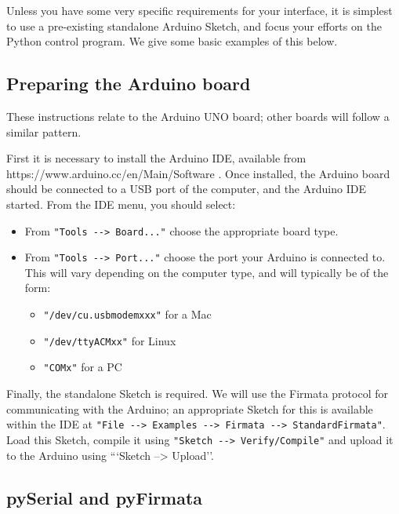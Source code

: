 \documentclass[10pt]{article}
\providecommand{\tightlist}{%
      \setlength{\itemsep}{0pt}\setlength{\parskip}{0pt}}
\begin{document}
Unless you have some very specific requirements for your interface, it
is simplest to use a pre-existing standalone Arduino Sketch, and focus
your efforts on the Python control program. We give some basic examples
of this below.

    \hypertarget{a.3-preparing-the-arduino-board}{%
\subsection{Preparing the Arduino
board}\label{a.3-preparing-the-arduino-board}}

These instructions relate to the Arduino UNO board; other boards will
follow a similar pattern.

First it is necessary to install the Arduino IDE, available from
https://www.arduino.cc/en/Main/Software . Once installed, the Arduino
board should be connected to a USB port of the computer, and the Arduino
IDE started. From the IDE menu, you should select: 
\begin{itemize}\tightlist
\item From
\texttt{"Tools\ -\/-\textgreater{}\ Board..."} choose the appropriate
board type. \item From \texttt{"Tools\ -\/-\textgreater{}\ Port..."} choose
the port your Arduino is connected to. This will vary depending on the
computer type, and will typically be of the form: \begin{itemize}\tightlist
\item 
\texttt{"/dev/cu.usbmodemxxx"} for a Mac \item \texttt{"/dev/ttyACMxx"} for
Linux \item \texttt{"COMx"} for a PC

\end{itemize}

\end{itemize}

Finally, the standalone Sketch is required. We will use the Firmata
protocol for communicating with the Arduino; an appropriate Sketch for
this is available within the IDE at
\texttt{"File\ -\/-\textgreater{}\ Examples\ -\/-\textgreater{}\ Firmata\ -\/-\textgreater{}\ StandardFirmata"}.
Load this Sketch, compile it using
\texttt{"Sketch\ -\/-\textgreater{}\ Verify/Compile"} and upload it to
the Arduino using ```Sketch --\textgreater{} Upload''.

    \hypertarget{a.4-pyserial-and-pyfirmata}{%
\subsection{pySerial and
pyFirmata}\label{a.4-pyserial-and-pyfirmata}}
\end{document}
